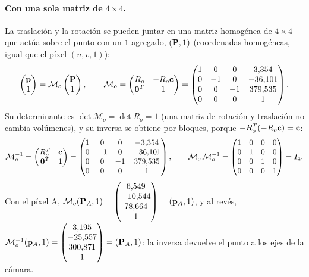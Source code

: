 \paragraph{Con una sola matriz de $4\times4$.} La traslación y la rotación se pueden juntar en una matriz homogénea de $4\times4$ que actúa sobre
el punto con un $1$ agregado, $(\mathbf{P},1)$ (coordenadas homogéneas, igual que el píxel $(u,v,1)$):
\begin{equation}
\begin{pmatrix}\mathbf{p}\\1\end{pmatrix}=\mathcal{M}_o\begin{pmatrix}\mathbf{P}\\1\end{pmatrix},\qquad
\mathcal{M}_o=\begin{pmatrix}R_o&-R_o\mathbf{c}\\\mathbf{0}^{T}&1\end{pmatrix}=\begin{pmatrix} 1 & 0 & 0 & 3{,}354 \\ 0 & -1 & 0 & -36{,}101 \\ 0 & 0 & -1 & 379{,}535 \\ 0 & 0 & 0 & 1 \end{pmatrix} .
\end{equation}
Su determinante es $\det\mathcal{M}_o=\det R_o=1$ (una matriz de rotación y traslación no cambia volúmenes), y su inversa se obtiene por bloques,
porque $-R_o^{T}(-R_o\mathbf{c})=\mathbf{c}$:
\begin{equation}
\mathcal{M}_o^{-1}=\begin{pmatrix}R_o^{T}&\mathbf{c}\\\mathbf{0}^{T}&1\end{pmatrix}=\begin{pmatrix} 1 & 0 & 0 & -3{,}354 \\ 0 & -1 & 0 & -36{,}101 \\ 0 & 0 & -1 & 379{,}535 \\ 0 & 0 & 0 & 1 \end{pmatrix},\qquad
\mathcal{M}_o\,\mathcal{M}_o^{-1}=\begin{pmatrix} 1 & 0 & 0 & 0 \\ 0 & 1 & 0 & 0 \\ 0 & 0 & 1 & 0 \\ 0 & 0 & 0 & 1 \end{pmatrix}=I_4 .
\end{equation}
Con el píxel A, $\mathcal{M}_o(\mathbf{P}_A,1)=\begin{pmatrix} 6{,}549 \\ -10{,}544 \\ 78{,}664 \\ 1 \end{pmatrix}=(\mathbf{p}_A,1)$, y al revés, $\mathcal{M}_o^{-1}(\mathbf{p}_A,1)=\begin{pmatrix} 3{,}195 \\ -25{,}557 \\ 300{,}871 \\ 1 \end{pmatrix}=(\mathbf{P}_A,1)$: la inversa
devuelve el punto a los ejes de la cámara.

